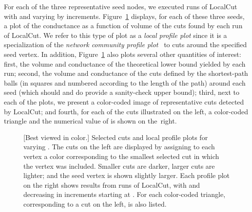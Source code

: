 \documentclass[11pt]{article}
\begin{document}
For each of the three representative seed nodes, we executed  runs of 
\textsf{LocalCut} with  and  varying by  increments. 
Figure~\ref{fig:teleportation} displays, for each of these three seeds, a 
plot of the conductance as a function of volume of the cuts found by each 
run of \textsf{LocalCut}. 
We refer to this type of plot as a \textit{local profile plot} since it is 
a specialization of the \textit{network community profile plot}~\cite{LLDM08_communities_CONF,LLDM09_communities_IM,LLM10_communities_CONF} 
to cuts around the specified seed vertex.
In addition, Figure~\ref{fig:teleportation} also plots several other 
quantities of interest:
first, the volume and conductance of the theoretical lower bound yielded by 
each run; 
second, the volume and conductance of the cuts defined by the shortest-path 
balls (in squares and numbered according to the length of the path) around 
each seed (which should and do provide a sanity-check upper bound); 
third, next to each of the plots, we present a color-coded image of 
representative cuts detected by \textsf{LocalCut}; and 
fourth, for each of the cuts illustrated on the left, a color-coded triangle 
and the numerical value of  is shown on the~right. 


\newcommand{\imscale}{.13}
\newcommand{\plscale}{.19}
\renewcommand{\imscale}{.2}
\renewcommand{\plscale}{.27}

\begin{figure}[] 
\caption{[Best viewed in color.]  
Selected cuts and local profile plots for varying . 
The cuts on the left are displayed by assigning to each vertex a color 
corresponding to the smallest selected cut in which the vertex was included. 
Smaller cuts are darker, larger cuts are lighter; and the seed vertex is 
shown slightly larger. 
Each profile plot on the right shows results from  runs of 
\textsf{LocalCut}, with  and  decreasing in  increments 
starting at .
For each color-coded triangle, corresponding to a cut on the left,  
is also listed.
}
\label{fig:teleportation}
\end{figure}
\end{document}
